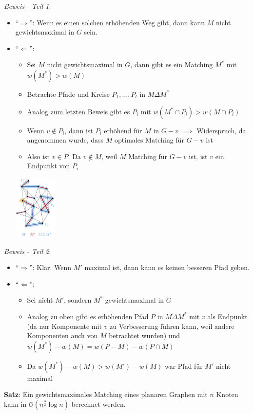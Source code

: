 \textit{Beweis - Teil 1}:
 \begin{itemize}
 	\item \enquote{$\Rightarrow$}: Wenn es einen solchen erhöhenden Weg gibt, dann kann $M$ nicht gewichtsmaximal in $G$ sein.
 	\item \enquote{$\Leftarrow$}:
 	\begin{itemize}
 		\item Sei $M$ nicht gewichtsmaximal in $G$, dann gibt es ein Matching $M^*$ mit $w(M^*)>w(M)$
 		\item Betrachte Pfade und Kreise $P_1,\ldots,P_t$ in $M\Delta M^*$
 		\item Analog zum letzten Beweis gibt es $P_i$ mit $w(M^*\cap P_i)>w(M\cap P_i)$
 		\item Wenn $v\notin P_i$, dann ist $P_i$ erhöhend für $M$ in $G-v$ $\implies$ Widerspruch, da angenommen wurde, dass $M$ optimales Matching für $G-v$ ist
 		\item Also ist $v\in P$. Da $v\notin M$, weil $M$ Matching für $G-v$ ist, ist $v$ ein Endpunkt von $P_i$
 	\end{itemize}
	 \begin{center}
	 	\includegraphics[width=0.17\textwidth]{images/moag2.png}
	 \end{center}
 \end{itemize}
\bigskip
\textit{Beweis - Teil 2}: 
\begin{itemize}
	\item \enquote{$\Rightarrow$}: Klar. Wenn $M'$ maximal ist, dann kann es keinen besseren Pfad geben.
	\item \enquote{$\Leftarrow$}: 
	\begin{itemize}
		\item Sei nicht $M'$, sondern $M^*$ gewichtsmaximal in $G$
		\item Analog zu oben gibt es erhöhenden Pfad $P$ in $M\Delta M^*$ mit $v$ als Endpunkt (da nur Komponente mit $v$ zu Verbesserung führen kann, weil andere Komponenten auch von $M$ betrachtet wurden) und $w(M^*)-w(M)=w(P-M)-w(P\cap M)$
		\item Da $w(M^*)-w(M)>w(M')-w(M)$ war Pfad für $M'$ nicht maximal
	\end{itemize}
\end{itemize}
\bigskip
\textbf{Satz}: Ein gewichtsmaximales Matching eines planaren Graphen mit $n$ Knoten kann in $\mathcal{O}(n^{\frac{3}{2}}\log n)$ berechnet werden.

